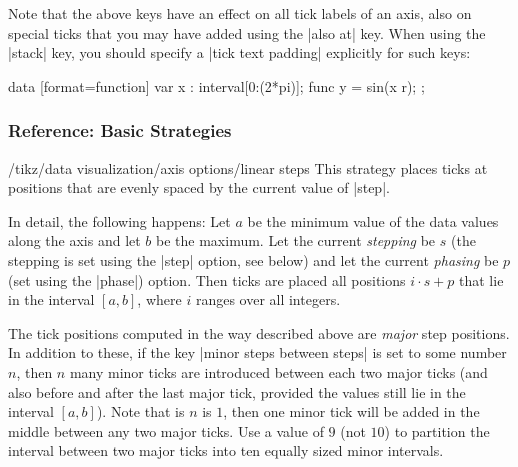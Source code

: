 Note that the above keys have an effect on all tick labels of an axis, also on special ticks that you may have added using the |also at| key. When using the |stack| key, you should specify a |tick text padding| explicitly for such keys:
%
\begin{codeexample}[
    width=7cm,
    preamble={\usetikzlibrary{datavisualization.formats.functions}},
]
\tikz \datavisualization
  [scientific axes,
   x axis={ticks={stack, many, major also at=
     {(pi) as [{tick text padding=2.5em}] $\pi$}}},
   visualize as smooth line]
  data [format=function] {
    var x : interval[0:(2*pi)];
    func y = sin(\value x r);
  };
\end{codeexample}


\subsubsection{Reference: Basic Strategies}
\label{section-dv-strategies}

\begin{key}{/tikz/data visualization/axis options/linear steps}
    This strategy places ticks at positions that are evenly spaced by the current value of |step|.

    In detail, the following happens: Let $a$ be the minimum value of the data values along the axis and let $b$ be the maximum. Let the current \emph{stepping} be $s$ (the stepping is set using the |step| option, see below) and let the current \emph{phasing} be $p$ (set using the |phase|) option. Then ticks are placed all positions $i\cdot s + p$ that lie in the interval $[a,b]$, where $i$ ranges over all integers.

    The tick positions computed in the way described above are \emph{major} step positions. In addition to these, if the key |minor steps between steps| is set to some number $n$, then $n$ many minor ticks are introduced between each two major ticks (and also before and after the last major tick, provided the values still lie in the interval $[a,b]$). Note that is $n$ is $1$, then one minor tick will be added in the middle between any two major ticks. Use a value of $9$ (not $10$) to partition the interval between two major ticks into ten equally sized minor intervals.
\begin{codeexample}[preamble={\usetikzlibrary{datavisualization}}]
\end{codeexample}
\end{key}

